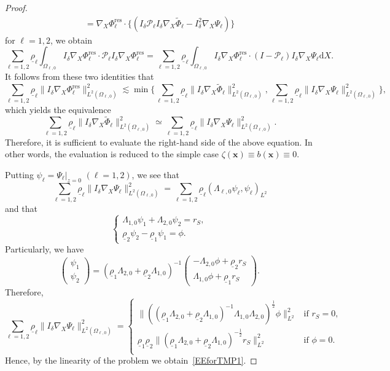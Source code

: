 \documentclass[11pt,leqno]{article}
\numberwithin{equation}{section}
\numberwithin{figure}{section}
\begin{document}
\begin{proof}
\begin{align*}
= \nabla_X\Phi_\ell^\mathrm{res}\cdot\{ (I_\delta\mathcal{P}_\ell I_\delta\nabla_X\tilde{\Phi}_\ell
 - I_\delta^2\nabla_X\Psi_\ell) \}
\end{align*}
%
for $\ell=1,2$, we obtain 
%
\[
\sum_{\ell=1,2}\underline{\rho}_\ell\int_{\Omega_{\ell,0}}
 I_\delta\nabla_X\Phi_\ell^\mathrm{res} \cdot \mathcal{P}_\ell I_\delta\nabla_X\Phi_\ell^\mathrm{res}
= \sum_{\ell=1,2}\underline{\rho}_\ell\int_{\Omega_{\ell,0}}
 I_\delta\nabla_X\Phi_\ell^\mathrm{res}\cdot(I-\mathcal{P}_\ell)I_\delta\nabla_X\Psi_\ell \mathrm{d}X.
\]
%
It follows from these two identities that 
%
\[
\sum_{\ell=1,2}\underline{\rho}_\ell\|I_\delta\nabla_X\Phi_\ell^\mathrm{res}\|_{L^2(\Omega_{\ell,0})}^2
\lesssim \min\biggl\{
 \sum_{\ell=1,2}\underline{\rho}_\ell\|I_\delta\nabla_X\tilde{\Phi}_\ell\|_{L^2(\Omega_{\ell,0})}^2,
 \sum_{\ell=1,2}\underline{\rho}_\ell\|I_\delta\nabla_X\Psi_\ell\|_{L^2(\Omega_{\ell,0})}^2
 \biggr\},
\]
%
which yields the equivalence 
%
\[
\sum_{\ell=1,2}\underline{\rho}_\ell\|I_\delta\nabla_X\tilde{\Phi}_\ell\|_{L^2(\Omega_{\ell,0})}^2
\simeq \sum_{\ell=1,2}\underline{\rho}_\ell\|I_\delta\nabla_X\Psi_\ell\|_{L^2(\Omega_{\ell,0})}^2.
\]
%
Therefore, it is sufficient to evaluate the right-hand side of the above equation. 
In other words, the evaluation is reduced to the simple case $\zeta(\bm{x})\equiv b(\bm{x})\equiv 0$. 


Putting $\psi_\ell = \Psi_\ell|_{z=0}$ $(\ell=1,2)$, we see that 
%
\[
\sum_{\ell=1,2}\underline{\rho}_\ell\|I_\delta\nabla_X\Psi_\ell\|_{L^2(\Omega_{\ell,0})}^2
= \sum_{\ell=1,2}\underline{\rho}_\ell(\Lambda_{\ell,0}\psi_\ell,\psi_\ell)_{L^2}
\]
%
and that 
%
\[
\begin{cases}
 \Lambda_{1,0}\psi_1+\Lambda_{2,0}\psi_2 = r_S, \\
 \underline{\rho}_2\psi_2-\underline{\rho}_1\psi_1 = \phi.
\end{cases}
\]
%
Particularly, we have 
%
\[
\begin{pmatrix} \psi_1 \\ \psi_2 \end{pmatrix}
= (\underline{\rho}_1\Lambda_{2,0}+\underline{\rho}_2\Lambda_{1,0})^{-1}
 \begin{pmatrix}
  -\Lambda_{2,0}\phi+\underline{\rho}_2r_S \\
   \Lambda_{1,0}\phi+\underline{\rho}_1r_S
 \end{pmatrix}.
\]
%
Therefore, 
%
\[
\sum_{\ell=1,2}\underline{\rho}_\ell\|I_\delta\nabla_X\Psi_\ell\|_{L^2(\Omega_{\ell,0})}^2
=
\begin{cases}
 \|((\underline{\rho}_1\Lambda_{2,0}+\underline{\rho}_2\Lambda_{1,0})^{-1}\Lambda_{1,0}\Lambda_{2,0})^\frac12\phi\|_{L^2}^2 
  &\mbox{if } r_S=0, \\
 \underline{\rho}_1\underline{\rho}_2\|(\underline{\rho}_1\Lambda_{2,0}+\underline{\rho}_2\Lambda_{1,0})^{-\frac12}r_S\|_{L^2}^2 
  &\mbox{if } \phi=0. \\
\end{cases}
\]
%
Hence, by the linearity of the problem we obtain~\eqref{EEforTMP1}. 



\end{proof}
\end{document}
